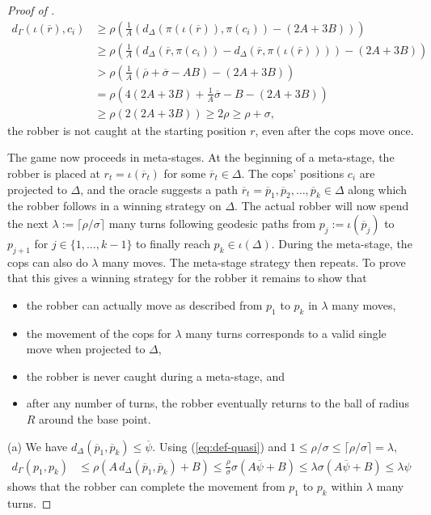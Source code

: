 \documentclass[10pt,a4paper]{amsart}
\renewcommand{\geq}{\geqslant}
\renewcommand{\leq}{\leqslant}
\begin{document}
\begin{proof}[Proof of ]
    \begin{align*}
        d_{\Gamma}(\iota(\overline{r}),c_i) & \geq \rho \left( \frac{1}{A} \left( d_\Delta (\pi(\iota(\overline{r})), \pi(c_i) )- (2A + 3B) \right)\right) \\
        &\geq \rho \left( \frac{1}{A} ( d_\Delta(\overline{r}, \pi(c_i)) - d_\Delta(\overline{r} , \pi(\iota(\overline{r})) ) )-(2A+ 3B) \right) \\
        &> \rho \left( \frac{1}{A} (\overline{\rho} + \overline{\sigma} - AB ) -(2A + 3B) \right) \\
        &=  \rho\left( 4(2A + 3B) + \frac{1}{A}\overline{\sigma} - B - (2A + 3B) \right) \\
        & \geq \rho(2(2A + 3B)) \geq 2\rho \geq \rho + \sigma ,
    \end{align*}
    the robber is not caught at the starting position $r$, even after the cops move once.

    The game now proceeds in meta-stages. At the beginning of a meta-stage, the robber is placed at $r_t = \iota(\overline{r}_t)$ for some $\overline{r}_t \in \Delta$. The cops' positions $c_i$ are projected to $\Delta$, and the oracle suggests a path $ \overline{r}_t = \overline{p}_1 , \overline{p}_2, \ldots , \overline{p}_k \in \Delta$ along which the robber follows in a winning strategy on $\Delta$. The actual robber will now spend the next $\lambda := \lceil \rho/\sigma \rceil $ many turns following geodesic paths from $p_j := \iota(\overline{p}_j)$ to $p_{j+1}$ for $j \in \{ 1, \ldots , k-1\}$ to finally reach $p_k \in \iota(\Delta)$. During the meta-stage, the cops can also do $\lambda$ many moves. The meta-stage strategy then repeats. To prove that this gives a winning strategy for the robber it remains to show that
    \begin{itemize}
        \item [(a)] the robber can actually move as described from $p_1$ to $p_k$ in $\lambda$ many moves,
        \item [(b)] the movement of the cops for $\lambda$ many turns corresponds to a valid single move when projected to $\Delta$,
        \item [(c)] the robber is never caught during a meta-stage, and
        \item [(d)] after any number of turns, the robber eventually returns to the ball of radius $R$ around the base point.
    \end{itemize}

    (a) We have $d_\Delta(\overline{p}_1, \overline{p}_k) \leq \overline{\psi}$. Using (\ref{eq:def-quasi}) and $1 \leq \rho/\sigma \leq \lceil \rho / \sigma \rceil = \lambda$,
\begin{align*}
    d_{\Gamma}(p_1, p_k) & \leq \rho\left(A \, d_\Delta(\overline{p}_1, \overline{p}_k) + B \right)
    \leq \frac{\rho}{\sigma} \sigma \left(A \overline{\psi} + B\right)
    \leq \lambda \sigma (A \overline{\psi} + B) \leq \lambda \psi
\end{align*}
shows that the robber can complete the movement from $p_1$ to $p_k$ within $\lambda$ many turns.



\end{proof}
\end{document}
